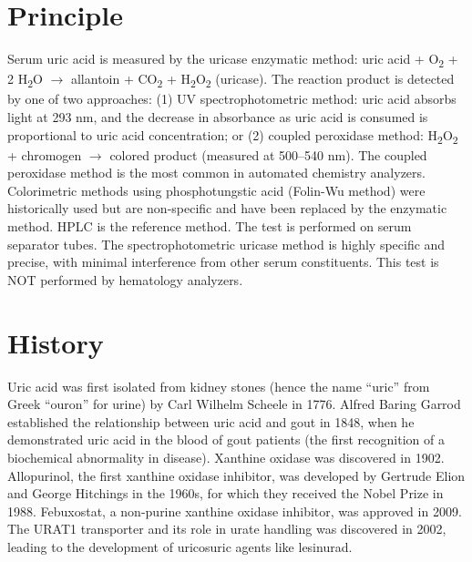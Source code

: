 \section*{Principle}
Serum uric acid is measured by the uricase enzymatic method: uric acid + O\textsubscript{2} + 2 H\textsubscript{2}O $\rightarrow$ allantoin + CO\textsubscript{2} + H\textsubscript{2}O\textsubscript{2} (uricase). The reaction product is detected by one of two approaches: (1) UV spectrophotometric method: uric acid absorbs light at 293 nm, and the decrease in absorbance as uric acid is consumed is proportional to uric acid concentration; or (2) coupled peroxidase method: H\textsubscript{2}O\textsubscript{2} + chromogen $\rightarrow$ colored product (measured at 500--540 nm). The coupled peroxidase method is the most common in automated chemistry analyzers. Colorimetric methods using phosphotungstic acid (Folin-Wu method) were historically used but are non-specific and have been replaced by the enzymatic method. HPLC is the reference method. The test is performed on serum separator tubes. The spectrophotometric uricase method is highly specific and precise, with minimal interference from other serum constituents. This test is NOT performed by hematology analyzers.

\section*{History}
Uric acid was first isolated from kidney stones (hence the name ``uric'' from Greek ``ouron'' for urine) by Carl Wilhelm Scheele in 1776. Alfred Baring Garrod established the relationship between uric acid and gout in 1848, when he demonstrated uric acid in the blood of gout patients (the first recognition of a biochemical abnormality in disease). Xanthine oxidase was discovered in 1902. Allopurinol, the first xanthine oxidase inhibitor, was developed by Gertrude Elion and George Hitchings in the 1960s, for which they received the Nobel Prize in 1988. Febuxostat, a non-purine xanthine oxidase inhibitor, was approved in 2009. The URAT1 transporter and its role in urate handling was discovered in 2002, leading to the development of uricosuric agents like lesinurad.

